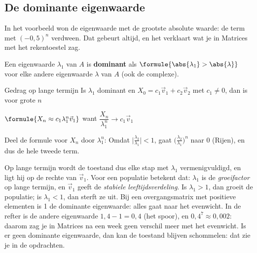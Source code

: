 \begin{oefeningen}
\end{oefeningen}

\subsection{De dominante eigenwaarde}

In het voorbeeld won de eigenwaarde met de grootste absolute waarde: de term met $(-0{,}5)^n$ verdween. Dat gebeurt altijd, en het verklaart wat je in Matrices met het rekentoestel zag.

\begin{theorie}
Een eigenwaarde $\lambda_1$ van $A$ is \textbf{\textcolor{accent}{dominant}} als $\formule{\abs{\lambda_1} > \abs{\lambda}}$ voor elke andere eigenwaarde $\lambda$ van $A$ (ook de complexe).

\begin{stelling}{Gedrag op lange termijn}
Is $\lambda_1$ dominant en $X_0 = c_1\vec v_1 + c_2\vec v_2$ met $c_1 \neq 0$, dan is voor grote $n$

\vspace{1mm}
\qquad $\formule{X_n \approx c_1\lambda_1^n\vec v_1}$ \qquad want \qquad $\dfrac{X_n}{\lambda_1^n} \to c_1\vec v_1$
\end{stelling}

\begin{bewijs}
Deel de formule voor $X_n$ door $\lambda_1^n$:
Omdat $\bigl|\tfrac{\lambda_2}{\lambda_1}\bigr| < 1$, gaat $\bigl(\tfrac{\lambda_2}{\lambda_1}\bigr)^n$ naar 0 (Rijen), en dus de hele tweede term.
\end{bewijs}
\end{theorie}

Op lange termijn wordt de toestand dus elke stap met $\lambda_1$ vermenigvuldigd, en ligt hij op de rechte van $\vec v_1$. Voor een populatie betekent dat: $\lambda_1$ is de \textit{groeifactor} op lange termijn, en $\vec v_1$ geeft de \textit{stabiele leeftijdsverdeling}. Is $\lambda_1 > 1$, dan groeit de populatie; is $\lambda_1 < 1$, dan sterft ze uit. Bij een overgangsmatrix met positieve elementen is 1 de dominante eigenwaarde: alles gaat naar het evenwicht. In de refter is de andere eigenwaarde $1{,}4 - 1 = 0{,}4$ (het spoor), en $0{,}4^7 \approx 0{,}002$: daarom zag je in Matrices na een week geen verschil meer met het evenwicht. Is er geen dominante eigenwaarde, dan kan de toestand blijven schommelen: dat zie je in de opdrachten.

